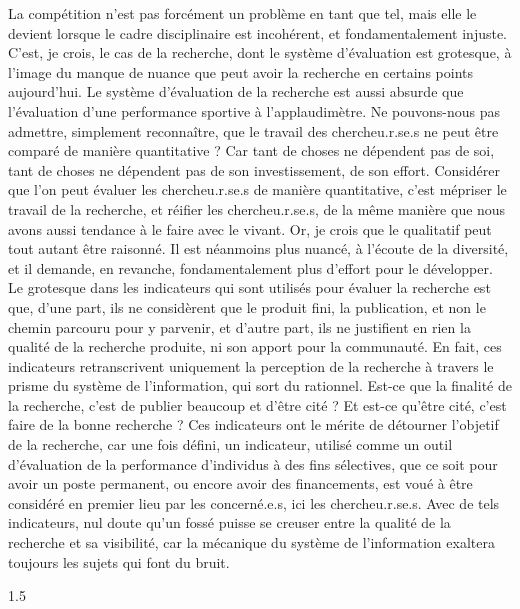La compétition n'est pas forcément un problème en tant que tel, mais elle le devient lorsque le cadre disciplinaire est incohérent, et fondamentalement injuste. C'est, je crois, le cas de la recherche, dont le système d'évaluation est grotesque, à l'image du manque de nuance que peut avoir la recherche en certains points aujourd'hui. Le système d'évaluation de la recherche est aussi absurde que l'évaluation d'une performance sportive à l'applaudimètre. Ne pouvons-nous pas admettre, simplement reconnaître, que le travail des chercheu.r.se.s ne peut être comparé de manière quantitative ? Car tant de choses ne dépendent pas de soi, tant de choses ne dépendent pas de son investissement, de son effort. Considérer que l'on peut évaluer les chercheu.r.se.s de manière quantitative, c'est mépriser le travail de la recherche, et réifier les chercheu.r.se.s, de la même manière que nous avons aussi tendance à le faire avec le vivant. Or, je crois que le qualitatif peut tout autant être raisonné. Il est néanmoins plus nuancé, à l'écoute de la diversité, et il demande, en revanche, fondamentalement plus d'effort pour le développer. Le grotesque dans les indicateurs qui sont utilisés pour évaluer la recherche est que, d'une part, ils ne considèrent que le produit fini, la publication, et non le chemin parcouru pour y parvenir, et d'autre part, ils ne justifient en rien la qualité de la recherche produite, ni son apport pour la communauté. En fait, ces indicateurs retranscrivent uniquement la perception de la recherche à travers le prisme du système de l'information, qui sort du rationnel. Est-ce que la finalité de la recherche, c'est de publier beaucoup et d'être cité ? Et est-ce qu'être cité, c'est faire de la bonne recherche ? Ces indicateurs ont le mérite de détourner l'objetif de la recherche, car une fois défini, un indicateur, utilisé comme un outil d'évaluation de la performance d'individus à des fins sélectives, que ce soit pour avoir un poste permanent, ou encore avoir des financements, est voué à être considéré en premier lieu par les concerné.e.s, ici les chercheu.r.se.s. Avec de tels indicateurs, nul doute qu'un fossé puisse se creuser entre la qualité de la recherche et sa visibilité, car la mécanique du système de l'information exaltera toujours les sujets qui font du bruit.


\begin{spacing}{1.5}
~
\end{spacing}

